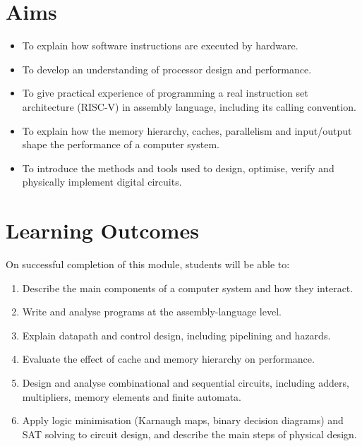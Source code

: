 \documentclass[11pt,a4paper]{article}
\begin{document}
\section{Aims}
\begin{itemize}
  \item To explain how software instructions are executed by hardware.
  \item To develop an understanding of processor design and performance.
  \item To give practical experience of programming a real instruction set
        architecture (RISC-V) in assembly language, including its calling convention.
  \item To explain how the memory hierarchy, caches, parallelism and input/output
        shape the performance of a computer system.
  \item To introduce the methods and tools used to design, optimise, verify and
        physically implement digital circuits.
\end{itemize}

\section{Learning Outcomes}
On successful completion of this module, students will be able to:
\begin{enumerate}[label=LO\arabic*.]
  \item Describe the main components of a computer system and how they interact.
  \item Write and analyse programs at the assembly-language level.
  \item Explain datapath and control design, including pipelining and hazards.
  \item Evaluate the effect of cache and memory hierarchy on performance.
  \item Design and analyse combinational and sequential circuits, including adders,
        multipliers, memory elements and finite automata.
  \item Apply logic minimisation (Karnaugh maps, binary decision diagrams) and SAT
        solving to circuit design, and describe the main steps of physical design.
\end{enumerate}
\end{document}
